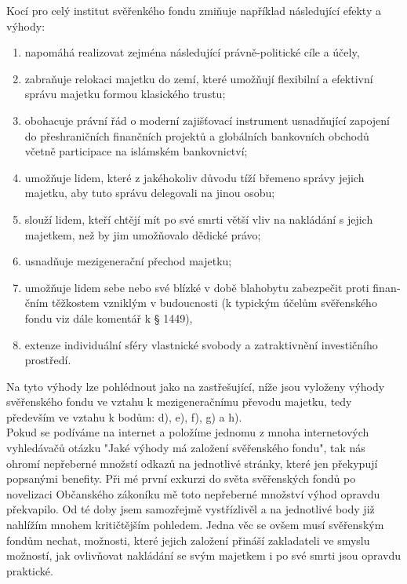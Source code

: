 \documentclass{article}
\begin{document}

Kocí pro celý institut svěřenkého fondu zmiňuje například následující efekty a výhody:\\

\begin{enumerate}[label=\alph*)]
\item napomáhá realizovat zejména následující právně-politické cíle a účely,
\item zabraňuje relokaci majetku do zemí, které umožňují flexibilní a efektivní správu majetku formou klasického trustu;
\item obohacuje právní řád o moderní zajišťovací instrument usnadňující zapojení do přeshraničních finančních projektů a globálních bankovních obchodů včetně participace na islámském bankovnictví;
\item umožňuje lidem, které z jakéhokoliv důvodu tíží břemeno správy jejich majetku, aby tuto správu delegovali na jinou osobu;
\item slouží lidem, kteří chtějí mít po své smrti větší vliv na nakládání s jejich majetkem, než by jim umožňovalo dědické právo;
\item usnadňuje mezigenerační přechod majetku;
\item umožňuje lidem sebe nebo své blízké v době blahobytu zabezpečit proti finan­čním těžkostem vzniklým v budoucnosti (k typickým účelům svěřenského fondu viz dále komentář k § 1449),
\item extenze individuální sféry vlastnické svobody a zatraktivnění investičního prostředí.
\end{enumerate}

Na tyto výhody lze pohlédnout jako na zastřešující, níže jsou vyloženy výhody svěřenského fondu ve vztahu k mezigeneračnímu převodu majetku, tedy především ve vztahu k bodům: d), e), f), g) a h). \\ 

Pokud se podíváme na internet a položíme jednomu z mnoha internetových vyhledávačů otázku "Jaké výhody má založení svěřenského fondu", tak nás ohromí nepřeberné množstí odkazů na jednotlivé stránky, které jen překypují popsanými benefity. Při mé první exkurzi do světa svěřenských fondů po novelizaci Občanského zákoníku mě toto nepřeberné množství výhod opravdu překvapilo. Od té doby jsem samozřejmě vystřízlivěl a na jednotlivé body již nahlížím mnohem kritičtějším pohledem. Jedna věc se ovšem musí svěřenským fondům nechat, možnosti, které jejich založení přináší zakladateli ve smyslu možností, jak ovlivňovat nakládání se svým majetkem i po své smrti jsou opravdu praktické.\\
\end{document}
